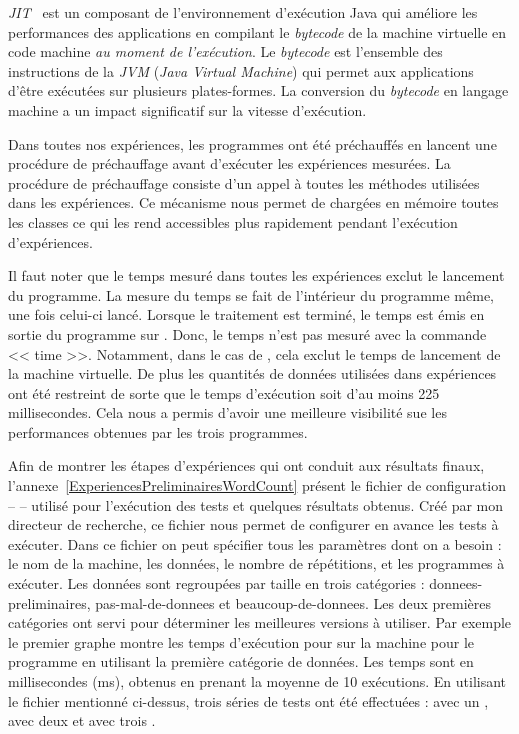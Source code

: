 \label{jitDescription.sect}
\emph{JIT}~\citep{cramer1997compiling} est un composant de l'environnement d'ex\'ecution Java qui am\'eliore les performances des applications en compilant le \emph{bytecode} de la machine virtuelle en code machine \emph{au moment de l'ex\'ecution}. Le \emph{bytecode} est l'ensemble des instructions de la \emph{JVM} (\emph{Java Virtual Machine}) qui permet aux applications d'\^etre ex\'ecut\'ees sur plusieurs plates-formes. La conversion du \emph{bytecode} en langage machine a un impact significatif sur la vitesse d'ex\'ecution.

Dans toutes nos exp\'eriences, les programmes  ont \'et\'e pr\'echauff\'es en lancent une proc\'edure de pr\'echauffage avant d'ex\'ecuter les exp\'eriences mesur\'ees. La proc\'edure de pr\'echauffage consiste d'un appel \`a toutes les m\'ethodes utilis\'ees dans les exp\'eriences. Ce m\'ecanisme nous permet de charg\'ees en m\'emoire toutes les classes ce qui les rend accessibles plus rapidement pendant l'ex\'ecution d'exp\'eriences.
 
Il faut noter que le temps mesur\'e dans toutes les exp\'eriences exclut le lancement du programme. La mesure du temps se fait de l'int\'erieur du programme m\^eme, une fois celui-ci lanc\'e. Lorsque le traitement est termin\'e, le temps est \'emis en sortie du programme sur . Donc, le temps n'est pas mesur\'e avec la commande << time >>. Notamment, dans le cas de , cela exclut le temps de lancement de la machine virtuelle. De plus les quantit\'es de donn\'ees utilis\'ees dans exp\'eriences ont \'et\'e restreint de sorte que le temps d'ex\'ecution soit d'au moins 225 millisecondes. Cela nous a permis d'avoir une meilleure visibilit\'e sue les performances obtenues par les trois programmes. 

Afin de montrer les \'etapes d'exp\'eriences qui ont conduit aux r\'esultats finaux, l'annexe~\ref{ExperiencesPreliminairesWordCount} pr\'esent le fichier de configuration --  -- utilis\'e pour l'ex\'ecution des tests et quelques r\'esultats obtenus. Cr\'e\'e par mon directeur de recherche, ce fichier nous permet de configurer en avance les tests \`a ex\'ecuter. Dans ce fichier on peut sp\'ecifier tous les param\`etres dont on a besoin : le nom de la machine, les donn\'ees, le nombre de r\'ep\'etitions, et les programmes \`a ex\'ecuter. Les donn\'ees sont regroup\'ees par taille en trois cat\'egories : donnees-preliminaires, pas-mal-de-donnees et beaucoup-de-donnees. Les deux premi\`eres cat\'egories ont servi pour d\'eterminer les meilleures versions \`a utiliser. Par exemple le premier graphe montre les temps d'ex\'ecution pour  sur la machine  pour le programme  en utilisant la premi\`ere cat\'egorie de donn\'ees. Les temps sont en millisecondes (ms), obtenus en prenant la moyenne de 10 ex\'ecutions.  En utilisant le fichier mentionn\'e ci-dessus, trois s\'eries de tests ont \'et\'e effectu\'ees :  avec un ,  avec deux  et  avec trois . 

